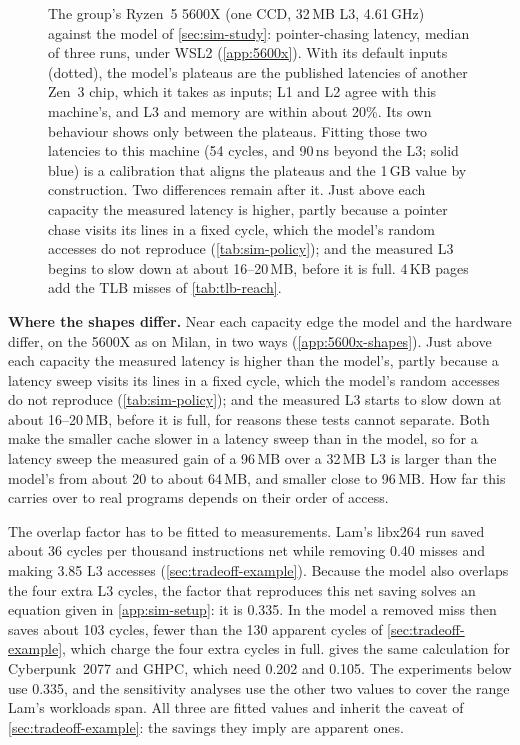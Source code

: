 \begin{figure}[htbp]
\caption[The group's Ryzen~5 5600X against the simulation]{The group's Ryzen~5 5600X (one CCD, 32\,MB L3, 4.61\,GHz) against the model of \cref{sec:sim-study}: pointer-chasing latency, median of three runs, under WSL2 (\cref{app:5600x}). With its default inputs (dotted), the model's plateaus are the published latencies of another Zen~3 chip, which it takes as inputs; L1 and L2 agree with this machine's, and L3 and memory are within about 20\%. Its own behaviour shows only between the plateaus. Fitting those two latencies to this machine (54 cycles, and 90\,ns beyond the L3; solid blue) is a calibration that aligns the plateaus and the 1\,GB value by construction. Two differences remain after it. Just above each capacity the measured latency is higher, partly because a pointer chase visits its lines in a fixed cycle, which the model's random accesses do not reproduce (\cref{tab:sim-policy}); and the measured L3 begins to slow down at about 16--20\,MB, before it is full. 4\,KB pages add the TLB misses of \cref{tab:tlb-reach}.}
\label{fig:m5600x-latency}
\end{figure}

\textbf{Where the shapes differ.} Near each capacity edge the model and the hardware differ, on the 5600X as on Milan, in two ways (\cref{app:5600x-shapes}). Just above each capacity the measured latency is higher than the model's, partly because a latency sweep visits its lines in a fixed cycle, which the model's random accesses do not reproduce (\cref{tab:sim-policy}); and the measured L3 starts to slow down at about 16--20\,MB, before it is full, for reasons these tests cannot separate. Both make the smaller cache slower in a latency sweep than in the model, so for a latency sweep the measured gain of a 96\,MB over a 32\,MB L3 is larger than the model's from about 20 to about 64\,MB, and smaller close to 96\,MB. How far this carries over to real programs depends on their order of access.

The overlap factor has to be fitted to measurements. Lam's libx264 run saved about 36 cycles per thousand instructions net while removing 0.40 misses and making 3.85 L3 accesses (\cref{sec:tradeoff-example}). Because the model also overlaps the four extra L3 cycles, the factor that reproduces this net saving solves an equation given in \cref{app:sim-setup}: it is 0.335. In the model a removed miss then saves about 103 cycles, fewer than the 130 apparent cycles of \cref{sec:tradeoff-example}, which charge the four extra cycles in full.  gives the same calculation for Cyberpunk~2077 and GHPC, which need 0.202 and 0.105. The experiments below use 0.335, and the sensitivity analyses use the other two values to cover the range Lam's workloads span. All three are fitted values and inherit the caveat of \cref{sec:tradeoff-example}: the savings they imply are apparent ones.

